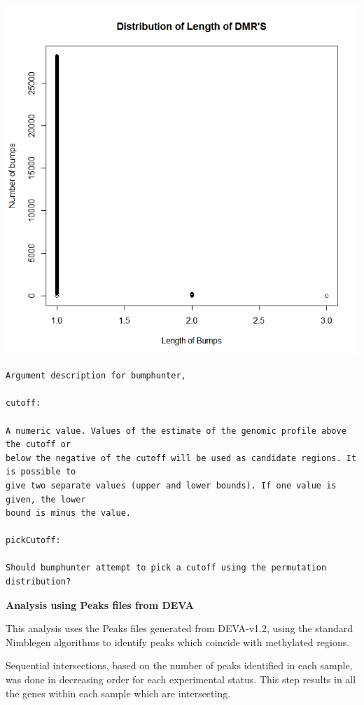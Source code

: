 \documentclass[11pt]{article}
\begin{document}
\includegraphics[scale=0.5]{bumpsDistribution.png}



\begin{verbatim}
Argument description for bumphunter,

cutoff: 

A numeric value. Values of the estimate of the genomic profile above the cutoff or
below the negative of the cutoff will be used as candidate regions. It is possible to
give two separate values (upper and lower bounds). If one value is given, the lower
bound is minus the value.

pickCutoff: 

Should bumphunter attempt to pick a cutoff using the permutation
distribution?

\end{verbatim}

\vspace{0.2in}

{\bf Analysis using Peaks files from DEVA}

This analysis uses the Peaks files generated from DEVA-v1.2, using the standard Nimblegen algorithms to identify peaks which coincide with methylated regions.

Sequential intersections, based on the number of peaks identified in each sample, was done in decreasing order for each experimental status. This step results in all the genes within each sample which are intersecting.
\end{document}

